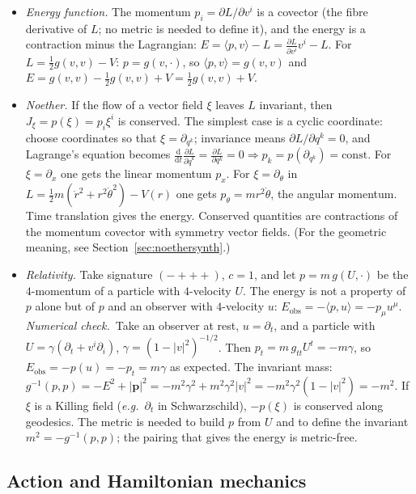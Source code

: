 \documentclass[11pt,a4paper]{article}
\numberwithin{equation}{section}
\theoremstyle{definition}
\theoremstyle{plain}
\newcommand{\numcheck}{\textit{Numerical check.}\ }
\newcommand{\dd}{\mathrm{d}}
\newcommand{\eg}{\emph{e.g.}\ }
\begin{document}
\begin{itemize}
\item \emph{Energy function.} The momentum $p_i=\partial L/\partial v^i$ is a covector (the fibre derivative of $L$; no metric is needed to define it), and the energy is a contraction minus the Lagrangian:
$E=\langle p,v\rangle-L=\frac{\partial L}{\partial v^i}v^i-L$. For $L=\frac12g(v,v)-V$: $p=g(v,\cdot)$, so $\langle p,v\rangle=g(v,v)$ and $E=g(v,v)-\frac12g(v,v)+V=\frac12g(v,v)+V$.
\item \emph{Noether.} If the flow of a vector field $\xi$ leaves $L$ invariant, then $J_\xi=p(\xi)=p_i\xi^i$ is conserved. The simplest case is a cyclic coordinate: choose coordinates so that $\xi=\partial_{q^k}$; invariance means $\partial L/\partial q^k=0$, and Lagrange's equation becomes
$\frac{\dd}{\dd t}\frac{\partial L}{\partial\dot q^k}=\frac{\partial L}{\partial q^k}=0\Rightarrow p_k=p(\partial_{q^k})=\mathrm{const}$.
For $\xi=\partial_x$ one gets the linear momentum $p_x$. For $\xi=\partial_\theta$ in $L=\frac12m(\dot r^2+r^2\dot\theta^2)-V(r)$ one gets $p_\theta=mr^2\dot\theta$, the angular momentum. Time translation gives the energy. Conserved quantities are contractions of the momentum covector with symmetry vector fields. (For the geometric meaning, see Section~\ref{sec:noethersynth}.)
\item \emph{Relativity.} Take signature $(-+++)$, $c=1$, and let $p=m\,g(U,\cdot)$ be the $4$-momentum of a particle with $4$-velocity $U$. The energy is not a property of $p$ alone but of $p$ and an observer with $4$-velocity $u$:
$E_{\mathrm{obs}}=-\langle p,u\rangle=-p_\mu u^\mu$.
\numcheck Take an observer at rest, $u=\partial_t$, and a particle with $U=\gamma(\partial_t+v^i\partial_i)$, $\gamma=(1-|v|^2)^{-1/2}$. Then $p_t=m\,g_{tt}U^t=-m\gamma$, so $E_{\mathrm{obs}}=-p(u)=-p_t=m\gamma$ as expected. The invariant mass: $g^{-1}(p,p)=-E^2+|\mathbf p|^2=-m^2\gamma^2+m^2\gamma^2|v|^2=-m^2\gamma^2(1-|v|^2)=-m^2$.
If $\xi$ is a Killing field (\eg $\partial_t$ in Schwarzschild), $-p(\xi)$ is conserved along geodesics. The metric is needed to build $p$ from $U$ and to define the invariant $m^2=-g^{-1}(p,p)$; the pairing that gives the energy is metric-free.
\end{itemize}

\subsection{Action and Hamiltonian mechanics}\label{sec:phys-hamilton}
\end{document}
